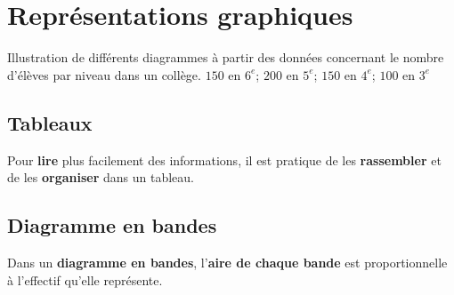 \section{Représentations graphiques}
Illustration de différents diagrammes à partir des données concernant le nombre d'élèves par niveau dans un collège.
$150$ en $6^e$; $200$ en $5^e$; $150$ en $4^e$; $100$ en $3^e$
\subsection{Tableaux}
\begin{remarque}
   Pour \textbf{lire} plus facilement des informations, il est pratique de les \textbf{rassembler} et de les \textbf{organiser} dans un tableau.
\end{remarque}

\subsection{Diagramme en bandes}
\begin{definition}
   Dans un \textbf{diagramme en bandes}, l'\textbf{aire de chaque bande} est proportionnelle à l'effectif qu'elle repr\'esente.
\end{definition}

\begin{center}
\end{center}

